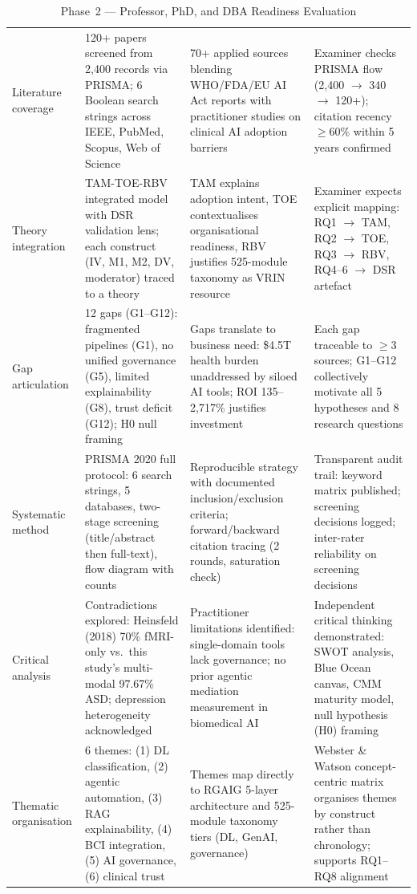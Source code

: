\begingroup\singlespacing\tablefontsize\tablestripes
\begin{xltabular}{\textwidth}{@{} l X X X @{}}
\caption{Phase~2 --- Professor, PhD, and DBA Readiness Evaluation}
\label{tab:phase2_readiness}\\
\toprule
{} &  &  &  \\
\midrule
\endfirsthead
\endhead
\bottomrule
\endlastfoot
Literature coverage    & 120+ papers screened from 2,400 records via PRISMA; 6 Boolean search strings across IEEE, PubMed, Scopus, Web of Science & 70+ applied sources blending WHO/FDA/EU AI Act reports with practitioner studies on clinical AI adoption barriers & Examiner checks PRISMA flow (2,400 $\rightarrow$ 340 $\rightarrow$ 120+); citation recency $\geq$60\% within 5 years confirmed \\
\addlinespace
Theory integration     & TAM-TOE-RBV integrated model with DSR validation lens; each construct (IV, M1, M2, DV, moderator) traced to a theory & TAM explains adoption intent, TOE contextualises organisational readiness, RBV justifies 525-module taxonomy as VRIN resource & Examiner expects explicit mapping: RQ1 $\rightarrow$ TAM, RQ2 $\rightarrow$ TOE, RQ3 $\rightarrow$ RBV, RQ4--6 $\rightarrow$ DSR artefact \\
\addlinespace
Gap articulation       & 12 gaps (G1--G12): fragmented pipelines (G1), no unified governance (G5), limited explainability (G8), trust deficit (G12); H0 null framing & Gaps translate to business need: \$4.5T health burden unaddressed by siloed AI tools; ROI 135--2{,}717\% justifies investment & Each gap traceable to $\geq$3 sources; G1--G12 collectively motivate all 5 hypotheses and 8 research questions \\
\addlinespace
Systematic method      & PRISMA 2020 full protocol: 6 search strings, 5 databases, two-stage screening (title/abstract then full-text), flow diagram with counts & Reproducible strategy with documented inclusion/exclusion criteria; forward/backward citation tracing (2 rounds, saturation check) & Transparent audit trail: keyword matrix published; screening decisions logged; inter-rater reliability on screening decisions \\
\addlinespace
Critical analysis      & Contradictions explored: Heinsfeld (2018) 70\% fMRI-only vs.\ this study's multi-modal 97.67\% ASD; depression heterogeneity acknowledged & Practitioner limitations identified: single-domain tools lack governance; no prior agentic mediation measurement in biomedical AI & Independent critical thinking demonstrated: SWOT analysis, Blue Ocean canvas, CMM maturity model, null hypothesis (H0) framing \\
\addlinespace
Thematic organisation  & 6 themes: (1) DL classification, (2) agentic automation, (3) RAG explainability, (4) BCI integration, (5) AI governance, (6) clinical trust & Themes map directly to RGAIG 5-layer architecture and 525-module taxonomy tiers (DL, GenAI, governance) & Webster \& Watson concept-centric matrix organises themes by construct rather than chronology; supports RQ1--RQ8 alignment \\
\end{xltabular}
\endgroup

